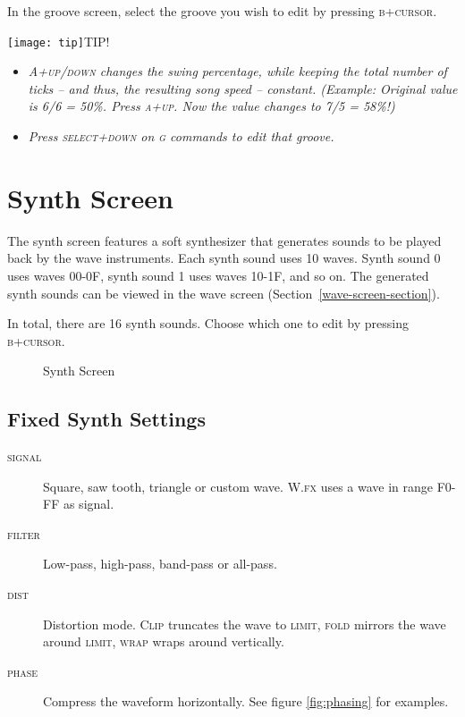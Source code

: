 In the groove screen, select the groove you wish to edit by pressing \textsc{b+cursor}.

\texttt{[image: tip]}TIP!
\begin{itemize}
	\item \textit{ \textsc{A+up/down} changes the swing percentage, while keeping the total number of ticks -- and thus, the resulting song speed -- constant. (Example: Original value is 6/6 = 50\%. Press \textsc{a+up}. Now the value changes to 7/5 = 58\%!) }
	\item \textit{ Press \textsc{select+down} on \textsc{g} commands to edit that groove. }
\end{itemize}

\section{Synth Screen}

The synth screen features a soft synthesizer that generates sounds to be played back by the wave instruments.
Each synth sound uses 10 waves. Synth sound 0 uses waves 00-0F, synth sound 1 uses waves 10-1F, and so on. The generated synth sounds can be viewed in the wave screen (Section~\ref{wave-screen-section}).

In total, there are 16 synth sounds. Choose which one to edit by pressing \textsc{b+cursor}.

\begin{figure}[htbp]
	\begin{center}
	\end{center}
	\caption{Synth Screen}
	\label{fig:synth}
\end{figure}

\subsection{Fixed Synth Settings}

\begin{description}
	\item[\textsc{signal}] Square, saw tooth, triangle or custom wave. \textsc{W.fx} uses a wave in range F0-FF as signal.
\item[\textsc{filter}] Low-pass, high-pass, band-pass or all-pass.
\item[\textsc{dist}] Distortion mode. \textsc{Clip} truncates the wave to \textsc{limit}, \textsc{fold} mirrors the wave around \textsc{limit}, \textsc{wrap} wraps around vertically.
\item[\textsc{phase}] \label{phase}
Compress the waveform horizontally. See figure \ref{fig:phasing} for examples.
\end{description}

